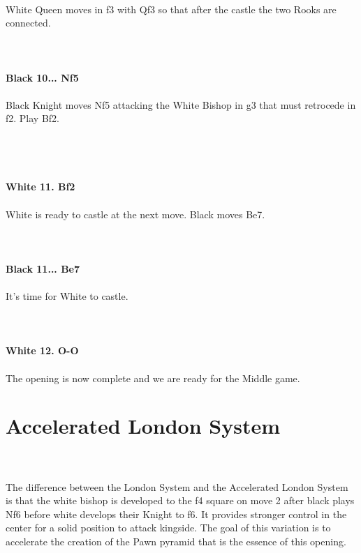 \documentclass{article}
\begin{document}
\\
White Queen moves in f3 with Qf3 so that after the castle the two Rooks are connected.\\
\\

\\
\\
\textbf{Black 10... Nf5}\\
\\
Black Knight moves Nf5 attacking the White Bishop in g3 that must retrocede in f2. Play Bf2.\\\\
\\

\\
\\
\textbf{White 11. Bf2}\\
\\
White is ready to castle at the next move. Black moves Be7.\\
\\

\\
\\
\textbf{Black 11... Be7}\\
\\
It's time for White to castle.\\
\\

\\
\\
\textbf{White 12. O-O}\\
\\
The opening is now complete and we are ready for the Middle game.\section{ Accelerated London System}

\\
\\
The difference between the London System and the Accelerated London System is that the white bishop is developed to the f4 square on move 2 after black plays Nf6 before white develops their Knight to f6. It provides stronger control in the center for a solid position to attack kingside. The goal of this variation is to accelerate the creation of the Pawn pyramid that is the essence of this opening.\\
\\
\end{document}
